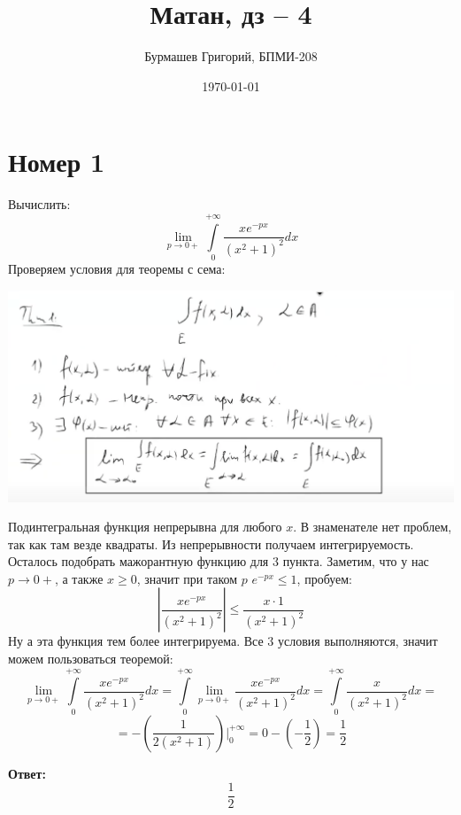 \documentclass[a4paper,12pt]{article}
\author{Бурмашев Григорий, БПМИ-208}
\title{Матан, дз -- 4}
\date{\today}
\begin{document}
\maketitle
\clearpage
\section*{Номер 1}
Вычислить:
\[
\lim_{p \rightarrow 0+ } \int\limits_{0}^{+\infty} \frac{xe^{-px}}{(x^2 + 1)^2} dx
\]
Проверяем условия для теоремы с сема:
\begin{center}
\includegraphics[scale=0.5]{5.png}
\end{center}
 Подинтегральная функция непрерывна для любого $x$. В знаменателе нет проблем, так как там везде квадраты. Из непрерывности получаем интегрируемость. Осталось подобрать мажорантную функцию для 3 пункта. Заметим, что у нас $p \rightarrow 0+$, а также $x \geq 0$, значит при таком $p$ \; $e^{-px}  \leq 1$, пробуем:
\[
\left|
\frac{xe^{-px}}{(x^2 + 1)^2}
\right|
\leq 
\frac{x \cdot 1}{(x^2 + 1)^2}
\]
Ну а эта функция тем более интегрируема. Все 3 условия выполняются, значит можем пользоваться теоремой:
\[
\lim_{p \rightarrow 0+ } \int\limits_{0}^{+\infty} \frac{xe^{-px}}{(x^2 + 1)^2} dx = 
 \int\limits_{0}^{+\infty}  \lim_{p \rightarrow 0+ } \frac{xe^{-px}}{(x^2 + 1)^2} dx = 
 \int\limits_{0}^{+\infty}  \frac{x}{(x^2 + 1)^2} dx = 
\]
\[
=
-\left(\frac{1}{2(x^2 + 1)}\right) \Bigg|_0^{+\infty} = 0 - \left(- \frac{1}{2}\right) = \frac{1}{2}
\]
\begin{center}
\textbf{Ответ: } 
\[
\frac{1}{2}
\]
\end{center}
\clearpage
\end{document}
